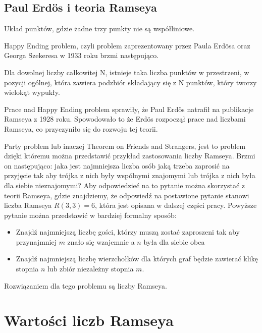 \subsection{Paul Erd\"os i teoria Ramseya}

\begin{definition}
 Układ punktów, gdzie żadne trzy punkty nie są współliniowe. \cite{gpos}
\end{definition}

Happy Ending problem, czyli problem zaprezentowany przez Paula Erd\"osa oraz Georga Szekeresa w 1933 roku brzmi następująco. 

\begin{theorem}
Dla dowolnej liczby całkowitej N, istnieje taka liczba punktów w przestrzeni, w pozycji ogólnej, która zawiera podzbiór składający się z N punktów, który tworzy wielokąt wypukły.
 \cite{erdoshappy} 
\end{theorem}

Prace nad Happy Ending problem sprawiły, że Paul Erd\"os natrafił na publikacje Ramseya z 1928 roku. Spowodowało to że Erd\"os rozpoczął prace nad liczbami Ramseya, co przyczyniło się do rozwoju tej teorii.


\hfill  \par
Party problem lub inaczej Theorem on Friends and Strangers, jest to problem dzięki któremu można przedstawić przykład zastosowania liczby Ramseya. Brzmi on następująco: jaka jest najmniejsza liczba osób jaką trzeba zaprosić na przyjęcie tak aby trójka z nich były wspólnymi znajomymi lub trójka z nich była dla siebie nieznajomymi\cite{partyproblem}? Aby odpowiedzieć na to pytanie można skorzystać z teorii Ramseya, gdzie znajdziemy, że odpowiedź na postawione pytanie stanowi liczba Ramseya $R(3,3)=6$, która jest opisana w dalszej części pracy. Powyższe pytanie można przedstawić w bardziej formalny sposób: 
\begin{itemize}
\item Znajdź najmniejszą liczbę gości, którzy muszą zostać zaproszeni tak aby przynajmniej $m$ znało się wzajemnie a $n$ była dla siebie obca \cite{partyformal}
\item Znajdź najmniejszą liczbę wierzchołków dla których graf będzie zawierać klikę stopnia $n$ lub zbiór niezależny stopnia $m$.
\end{itemize}
Rozwiązaniem dla tego problemu są liczby Ramseya. 

\section{Wartości liczb Ramseya}

